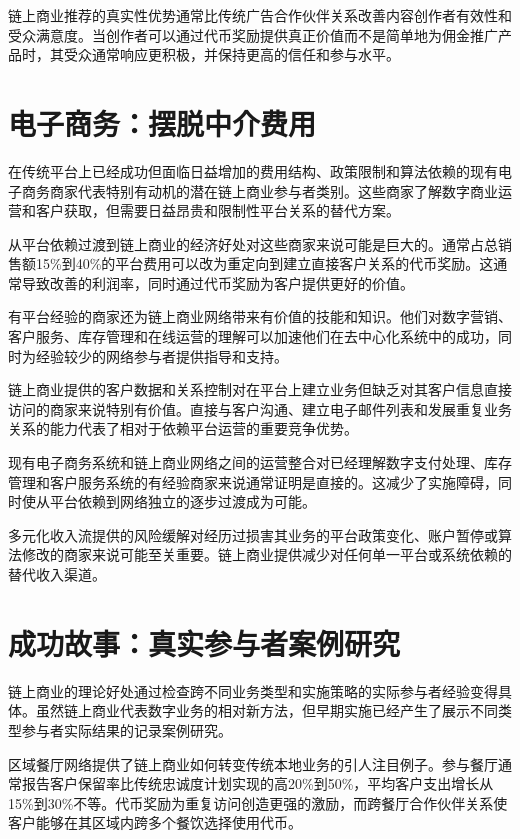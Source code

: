 \documentclass[
  Letterpaper,
]{scrbook}
\begin{document}
链上商业推荐的真实性优势通常比传统广告合作伙伴关系改善内容创作者有效性和受众满意度。当创作者可以通过代币奖励提供真正价值而不是简单地为佣金推广产品时，其受众通常响应更积极，并保持更高的信任和参与水平。

\section{电子商务：摆脱中介费用}\label{ux7535ux5b50ux5546ux52a1ux6446ux8131ux4e2dux4ecbux8d39ux7528}

在传统平台上已经成功但面临日益增加的费用结构、政策限制和算法依赖的现有电子商务商家代表特别有动机的潜在链上商业参与者类别。这些商家了解数字商业运营和客户获取，但需要日益昂贵和限制性平台关系的替代方案。

从平台依赖过渡到链上商业的经济好处对这些商家来说可能是巨大的。通常占总销售额15\%到40\%的平台费用可以改为重定向到建立直接客户关系的代币奖励。这通常导致改善的利润率，同时通过代币奖励为客户提供更好的价值。

有平台经验的商家还为链上商业网络带来有价值的技能和知识。他们对数字营销、客户服务、库存管理和在线运营的理解可以加速他们在去中心化系统中的成功，同时为经验较少的网络参与者提供指导和支持。

链上商业提供的客户数据和关系控制对在平台上建立业务但缺乏对其客户信息直接访问的商家来说特别有价值。直接与客户沟通、建立电子邮件列表和发展重复业务关系的能力代表了相对于依赖平台运营的重要竞争优势。

现有电子商务系统和链上商业网络之间的运营整合对已经理解数字支付处理、库存管理和客户服务系统的有经验商家来说通常证明是直接的。这减少了实施障碍，同时使从平台依赖到网络独立的逐步过渡成为可能。

多元化收入流提供的风险缓解对经历过损害其业务的平台政策变化、账户暂停或算法修改的商家来说可能至关重要。链上商业提供减少对任何单一平台或系统依赖的替代收入渠道。

\section{成功故事：真实参与者案例研究}\label{ux6210ux529fux6545ux4e8bux771fux5b9eux53c2ux4e0eux8005ux6848ux4f8bux7814ux7a76}

链上商业的理论好处通过检查跨不同业务类型和实施策略的实际参与者经验变得具体。虽然链上商业代表数字业务的相对新方法，但早期实施已经产生了展示不同类型参与者实际结果的记录案例研究。

区域餐厅网络提供了链上商业如何转变传统本地业务的引人注目例子。参与餐厅通常报告客户保留率比传统忠诚度计划实现的高20\%到50\%，平均客户支出增长从15\%到30\%不等。代币奖励为重复访问创造更强的激励，而跨餐厅合作伙伴关系使客户能够在其区域内跨多个餐饮选择使用代币。
\end{document}
